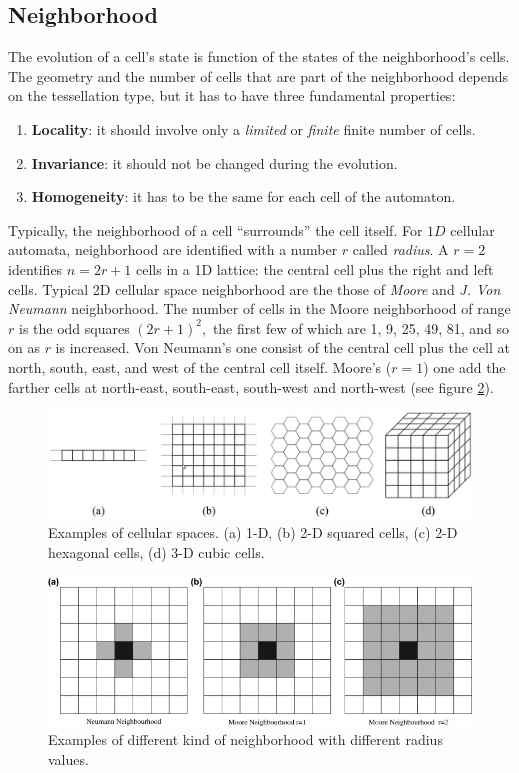 \subsection{Neighborhood}
The evolution of a cell's state is function of the states of the neighborhood's
cells. The geometry and the number of cells that are part of the neighborhood
depends on the tessellation type, but it has to have three fundamental
properties:
\begin{enumerate}
  \item \textbf{Locality}: it should involve only a \textit{limited} or \textit{finite} finite number of cells.
  \item \textbf{Invariance}: it should not be changed during the evolution.
  \item \textbf{Homogeneity}: it has to be the same for each cell of the
  automaton.
\end{enumerate}
Typically, the neighborhood of a cell ``surrounds'' the cell itself. For $1D$ cellular automata, neighborhood are identified with a number $r$ called
\textit{radius}\cite{wolfram1983}. A $r=2$ identifies
$n=2r+1$ cells in a 1D lattice: the central cell plus the
right and left cells. Typical 2D cellular space neighborhood are the those of
\textit{Moore} and \textit{J. Von Neumann} neighborhood. The number of cells in the Moore neighborhood of range $r$ is the odd squares $(2r+1)^2,$ the
first few of which are 1, 9, 25, 49, 81, and so on as $r$ is increased.
Von Neumann's one consist of the central cell plus the cell at north, south,
east, and west of the central cell itself. Moore's ($r=1$)
one add  the farther cells at north-east, south-east, south-west and north-west
(see figure \ref{mooreNeigh}).


\begin{figure}
	\centering
	\caption{Examples of cellular spaces. (a) 1-D, (b) 2-D squared cells,
		(c) 2-D hexagonal cells, (d) 3-D cubic cells.}\label{spazioCellulare}
	\includegraphics[scale=0.23]{./images/CA_FDM/spazioCellulare}
\end{figure}

\begin{figure}
\centering
\caption{Examples of different kind of neighborhood with
different radius values.}\label{mooreNeigh}
\includegraphics[width=1.0\textwidth]{./images/CA_FDM/mooreNeigh}
\end{figure}


